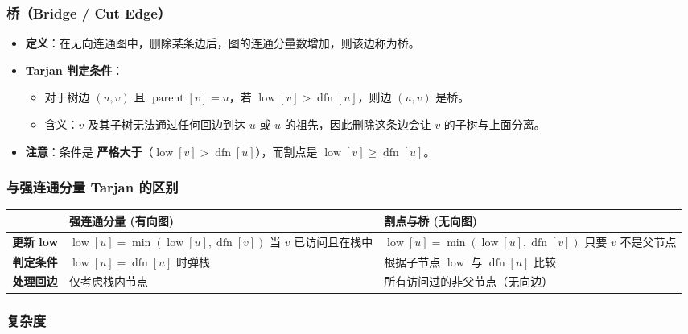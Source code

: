 \subsubsection{桥（Bridge / Cut Edge）}

\begin{itemize}
  \item \textbf{定义}：在无向连通图中，删除某条边后，图的连通分量数增加，则该边称为桥。
  \item \textbf{Tarjan 判定条件}：
    \begin{itemize}
      \item 对于树边 $(u, v)$ 且 $\operatorname{parent}[v] = u$，若 $\operatorname{low}[v] > \operatorname{dfn}[u]$，则边 $(u, v)$ 是桥。
      \item 含义：$v$ 及其子树无法通过任何回边到达 $u$ 或 $u$ 的祖先，因此删除这条边会让 $v$ 的子树与上面分离。
    \end{itemize}
  \item \textbf{注意}：条件是 \textbf{严格大于}（$\operatorname{low}[v] > \operatorname{dfn}[u]$），而割点是 $\operatorname{low}[v] \ge \operatorname{dfn}[u]$。
\end{itemize}

\subsubsection{与强连通分量 Tarjan 的区别}

\begin{tabularx}{\textwidth}{|c|X|X|}
  \hline
  & \textbf{强连通分量 (有向图)} & \textbf{割点与桥 (无向图)} \\
  \hline
  \textbf{更新 low} &
  $\operatorname{low}[u] = \min(\operatorname{low}[u], \operatorname{dfn}[v])$ 当 $v$ 已访问且在栈中 &
  $\operatorname{low}[u] = \min(\operatorname{low}[u], \operatorname{dfn}[v])$ 只要 $v$ 不是父节点 \\
  \hline
  \textbf{判定条件} &
  $\operatorname{low}[u] = \operatorname{dfn}[u]$ 时弹栈 &
  根据子节点 $\operatorname{low}$ 与 $\operatorname{dfn}[u]$ 比较 \\
  \hline
  \textbf{处理回边} &
  仅考虑栈内节点 &
  所有访问过的非父节点（无向边） \\
  \hline
\end{tabularx}

\subsubsection{复杂度}

